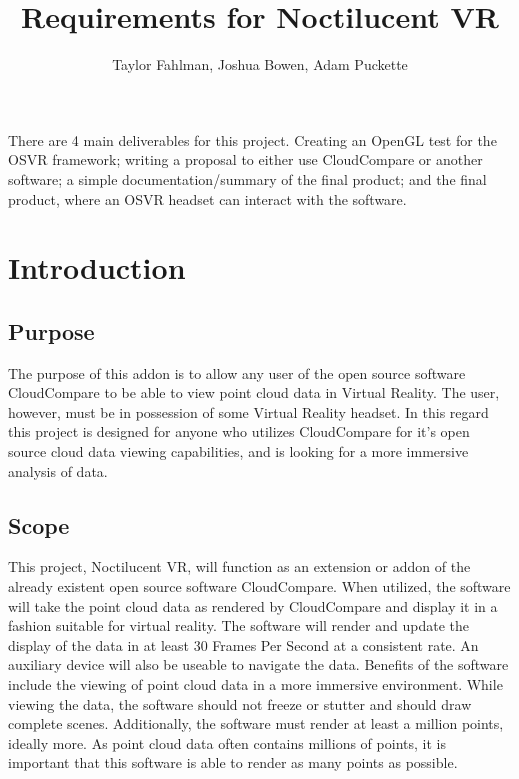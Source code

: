 \documentclass{article}
\begin{document}
\title {Requirements for Noctilucent VR}
\author {Taylor Fahlman, Joshua Bowen, Adam Puckette}

\maketitle

\abstract
There are 4 main deliverables for this project. Creating an OpenGL test for the OSVR framework;
writing a proposal to either use CloudCompare or another software; a simple documentation/summary of
the final product; and the final product, where an OSVR headset can interact with the software.

\newpage
\thispagestyle{empty}
\mbox{}

\section{Introduction}
\subsection{Purpose}

The purpose of this addon is to allow any user of the open source software CloudCompare to be able to view point cloud data in Virtual Reality.
The user, however, must be in possession of some Virtual Reality headset.
In this regard this project is designed for anyone who utilizes CloudCompare for it's open source cloud data viewing capabilities,
and is looking for a more immersive analysis of data.

\subsection{Scope}

This project, Noctilucent VR, will function as an extension or addon of the already existent open source software CloudCompare.
When utilized, the software will take the point cloud data as rendered by CloudCompare and display it in a fashion suitable for virtual reality.
The software will render and update the display of the data in at least 30 Frames Per Second at a consistent rate.
An auxiliary device will also be useable to navigate the data.
Benefits of the software include the viewing of point cloud data in a more immersive environment.
While viewing the data, the software should not freeze or stutter and should draw complete scenes. 
Additionally, the software must render at least a million points, ideally more.
As point cloud data often contains millions of points, it is important that this software is able to render as many points as possible.
\end{document}
